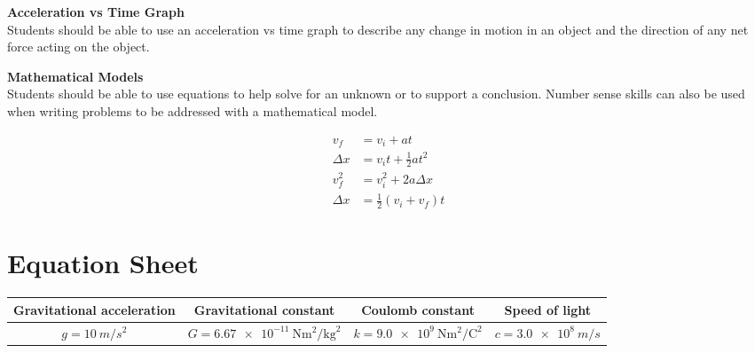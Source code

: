 \documentclass[dvipsnames]{article}
\begin{document}
\textbf{Acceleration vs Time Graph}\\
Students should be able to use an acceleration vs time graph to describe any change in motion in an object and the direction of any net force acting on the object.

\begin{center}
\end{center}

\textbf{Mathematical Models}\\
Students should be able to use equations to help solve for an unknown or to support a conclusion.  Number sense skills can also be used when writing problems to be addressed with a mathematical model.

\vspace{-1em}
\begin{align*}
    v_f &= v_i + at \\[1ex]
    \Delta x &= v_i t + \frac{1}{2}at^2 \\[1ex]
    v_f^2 &= v_i^2 + 2 a \Delta x \\[1ex]
    \Delta x &= \frac{1}{2} \left(v_i + v_f\right) t
\end{align*}

\clearpage

\section*{Equation Sheet}


\begin{center}
\bgroup
\def\arraystretch{1.5}
\begin{tabular}{|c|c|c|c|}
    \hline
    Gravitational acceleration & Gravitational constant & Coulomb constant & Speed of light\\ \hline
    $g = \SI{10}{m/s^2}$ & $G = \SI[per-mode=fraction]{6.67e-11}{\newton\meter\squared\per\kilogram\squared}$ & $k = \SI[per-mode=fraction]{9.0e9}{\newton\meter\squared\per\coulomb\squared}$ & $c = \SI{3.0e8}{m/s}$ \\ \hline
\end{tabular}
\egroup
\end{center}
\end{document}
